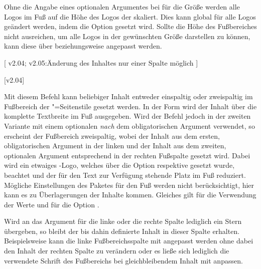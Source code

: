 \begin{DeclareEntity*}{}
\begin{DeclareEntity*}{}
\begin{DeclareEntity*}{}
\begin{Declaration}
Ohne die Angabe eines optionalen Argumentes bei  für die Größe 
werden alle Logos im Fuß auf die Höhe des Logos der \TnUD skaliert. Dies kann 
global für alle Logos geändert werden, indem die Option 
 gesetzt wird. Sollte die Höhe des 
Fußbereiches nicht ausreichen, um alle Logos in der gewünschten Größe 
darstellen zu können, kann diese über  
beziehungsweise  angepasst werden.
\end{Declaration}

\begin{Declaration}
  {}
[%
  v2.04;
  v2.05:Änderung des Inhaltes nur einer Spalte möglich
]
\begin{Declaration}
  {}
  [v2.04]

Mit diesem Befehl kann beliebiger Inhalt entweder einspaltig oder zweispaltig 
im Fußbereich der "=Seitenstile gesetzt werden. In der 
Form  wird der Inhalt über die komplette 
Textbreite im Fuß ausgegeben. Wird der Befehl jedoch in der zweiten Variante 
 mit 
einem optionalen \emph{nach} dem obligatorischen Argument verwendet, so 
erscheint der Fußbereich zweispaltig, wobei der Inhalt aus dem ersten, 
obligatorischen Argument in der linken und der Inhalt aus dem zweiten, 
optionalen Argument entsprechend in der rechten Fußspalte gesetzt wird. Dabei 
wird ein etwaiges \DDC-Logo, welches über die Option  respektive
 gesetzt wurde, beachtet und der für den Text zur Verfügung 
stehende Platz im Fuß reduziert. Mögliche Einstellungen des Paketes 
 für den Fuß werden nicht berücksichtigt, hier kann 
es zu Überlagerungen der Inhalte kommen. Gleiches gilt für die Verwendung der 
Werte  und  für die Option .

%
Wird an das Argument für die linke oder die rechte Spalte lediglich ein Stern 
\PValue{*} übergeben, so bleibt der bis dahin definierte Inhalt in dieser 
Spalte erhalten. Beispielsweise kann die linke Fußbereichsspalte mit 
 angepasst werden ohne 
dabei den Inhalt der rechten Spalte zu verändern oder es ließe sich lediglich 
die verwendete Schrift des Fußbereichs bei gleichbleibendem Inhalt mit 
%
anpassen.


\end{Declaration}
\end{Declaration}
\end{DeclareEntity*}
\end{DeclareEntity*}
\end{DeclareEntity*}
